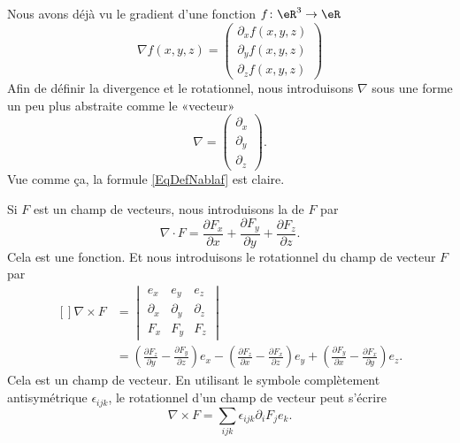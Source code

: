Nous avons déjà vu le gradient d'une fonction $f\colon \eR^3\to \eR$
\begin{equation}        \label{EqDefNablaf}
    \nabla f(x,y,z)=\begin{pmatrix}
        \partial_xf(x,y,z)    \\ 
        \partial_yf(x,y,z)    \\ 
        \partial_zf(x,y,z)    
    \end{pmatrix}
\end{equation}
Afin de définir la divergence et le rotationnel, nous introduisons $\nabla$ sous une forme un peu plus abstraite comme le «vecteur»
\begin{equation}
    \nabla=\begin{pmatrix}
        \partial_x    \\ 
        \partial_y    \\ 
        \partial_z
    \end{pmatrix}.
\end{equation}
Vue comme ça, la formule \eqref{EqDefNablaf} est claire.

Si $F$ est un champ de vecteurs, nous introduisons la  de $F$ par
\begin{equation}
    \nabla\cdot F=\frac{ \partial F_x }{ \partial x }+\frac{ \partial F_y }{ \partial y }+\frac{ \partial F_z }{ \partial z }.
\end{equation}
Cela est une fonction. Et nous introduisons le rotationnel du champ de vecteur $F$ par
\begin{equation}
    \begin{aligned}[]
        \nabla\times F&=\begin{vmatrix}
              e_x  &   e_y    &   e_z    \\
            \partial_x    &   \partial_y    &   \partial_z    \\
            F_x    &   F_y    &   F_z
        \end{vmatrix}\\
        &=
        \left( \frac{ \partial F_z }{ \partial y }-\frac{ \partial F_y }{ \partial z } \right)e_x
        -\left( \frac{ \partial F_z }{ \partial x }-\frac{ \partial F_x }{ \partial z } \right)e_y
        +\left( \frac{ \partial F_y }{ \partial x }-\frac{ \partial F_x }{ \partial y } \right)e_z.
    \end{aligned}
\end{equation}
Cela est un champ de vecteur. En utilisant le symbole complètement antisymétrique \( \epsilon_{ijk}\), le rotationnel d'un champ de vecteur peut s'écrire
\begin{equation}
    \nabla\times F=\sum_{ijk}\epsilon_{ijk}\partial_i F_j e_k.
\end{equation}


